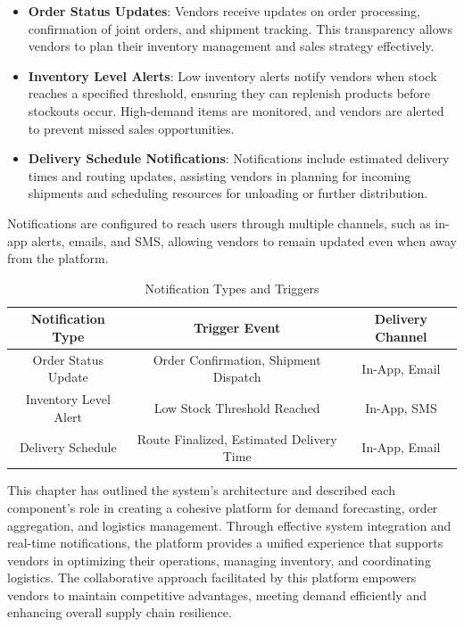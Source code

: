 \begin{itemize}
    \item \textbf{Order Status Updates}: Vendors receive updates on order processing, confirmation of joint orders, and shipment tracking. This transparency allows vendors to plan their inventory management and sales strategy effectively.
    \item \textbf{Inventory Level Alerts}: Low inventory alerts notify vendors when stock reaches a specified threshold, ensuring they can replenish products before stockouts occur. High-demand items are monitored, and vendors are alerted to prevent missed sales opportunities.
    \item \textbf{Delivery Schedule Notifications}: Notifications include estimated delivery times and routing updates, assisting vendors in planning for incoming shipments and scheduling resources for unloading or further distribution.
\end{itemize}

Notifications are configured to reach users through multiple channels, such as in-app alerts, emails, and SMS, allowing vendors to remain updated even when away from the platform.

\begin{table}[H]
\centering
\caption{Notification Types and Triggers}
\begin{tabular}{|c|c|c|}
\hline
\textbf{Notification Type} & \textbf{Trigger Event} & \textbf{Delivery Channel} \\ \hline
Order Status Update & Order Confirmation, Shipment Dispatch & In-App, Email \\ \hline
Inventory Level Alert & Low Stock Threshold Reached & In-App, SMS \\ \hline
Delivery Schedule & Route Finalized, Estimated Delivery Time & In-App, Email \\ \hline
\end{tabular}
\end{table}


This chapter has outlined the system's architecture and described each component's role in creating a cohesive platform for demand forecasting, order aggregation, and logistics management. Through effective system integration and real-time notifications, the platform provides a unified experience that supports vendors in optimizing their operations, managing inventory, and coordinating logistics. The collaborative approach facilitated by this platform empowers vendors to maintain competitive advantages, meeting demand efficiently and enhancing overall supply chain resilience.
